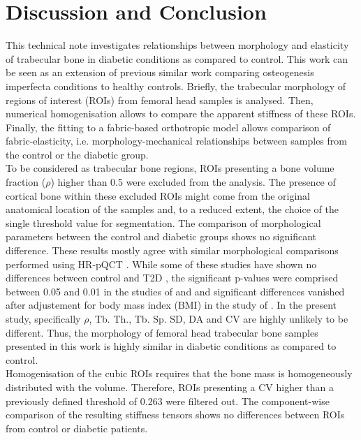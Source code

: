 \documentclass[a4paper,fleqn]{DC_ArtStyle}
\begin{document}
	\section{Discussion and Conclusion}
	This technical note investigates relationships between morphology and elasticity of trabecular bone in diabetic conditions as compared to control.
	This work can be seen as an extension of previous similar work \cite{Simon2022} comparing osteogenesis imperfecta conditions to healthy controls.
	Briefly, the trabecular morphology of regions of interest (ROIs) from femoral head samples is analysed.
	Then, numerical homogenisation allows to compare the apparent stiffness of these ROIs.
	Finally, the fitting to a fabric-based orthotropic model \cite{Zysset1995} allows comparison of fabric-elasticity, i.e. morphology-me\-chanical relationships between samples from the control or the diabetic group.
	\\[0.5em]
	To be considered as trabecular bone regions, ROIs presenting a bone volume fraction ($\rho$) higher than 0.5 were excluded from the analysis.
	The presence of cortical bone within these excluded ROIs might come from the original anatomical location of the samples and, to a reduced extent, the choice of the single threshold value for segmentation.
	The comparison of morphological parameters between the control and diabetic groups shows no significant difference.
	These results mostly agree with similar morphological comparisons performed using HR-pQCT \cite{Burghardt2010, Shu2012, Farr2014, Paccou2015, Samelson2018, vanHulten2024}.
	While some of these studies have shown no differences between control and T2D \cite{Shu2012, Samelson2018, vanHulten2024}, the significant p-values were comprised between 0.05 and 0.01 in the studies of \citeauthor{Burghardt2010}\cite{Burghardt2010} and \citeauthor{Paccou2015}\cite{Paccou2015} and significant differences vanished after adjustement for body mass index (BMI) in the study of \citeauthor{Farr2014}\cite{Farr2014}.
	In the present study, specifically $\rho$, Tb. Th., Tb. Sp. SD, DA and CV are highly unlikely to be different.
	Thus, the morphology of femoral head trabecular bone samples presented in this work is highly similar in diabetic conditions as compared to control.
	\\[0.5em]
	Homogenisation of the cubic ROIs requires that the bone mass is homogeneously distributed with the volume.
	Therefore, ROIs presenting a CV higher than a previously defined threshold of 0.263 \cite{Panyasantisuk2015} were filtered out.
	The component-wise comparison of the resulting stiffness tensors shows no differences between ROIs from control or diabetic patients.
\end{document}
